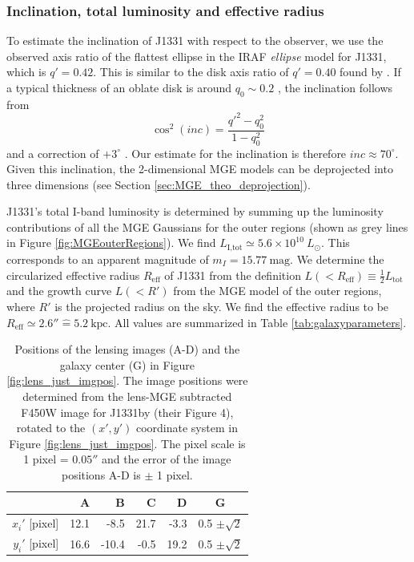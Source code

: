 \documentclass[useAMS,usenatbib]{mnras}
\begin{document}
\subsubsection{Inclination, total luminosity and effective radius}

To estimate the inclination of J1331 with respect to the observer, we use the observed axis ratio of the flattest ellipse in the IRAF \emph{ellipse} model for J1331, which is $q'=0.42$. This is similar to the disk axis ratio of $q' = 0.40$ found by \citet{SWELLSI}. If a typical thickness of an oblate disk is around $q_0 \sim 0.2$ \citep{1958MeLu2.136....1H}, the inclination follows from 
\begin{equation}
\cos^2 (inc) = \frac{q'^2 - q_0^2}{1 - q_0^2}
\end{equation}
and a correction of $+3^\circ$ \citep{1988ngc..book.....T}. Our estimate for the inclination is therefore $inc \approx 70^\circ$. Given this inclination, the 2-dimensional MGE models can be deprojected into three dimensions (see Section \ref{sec:MGE_theo_deprojection}).

J1331's total I-band luminosity is determined by summing up the luminosity contributions of all the MGE Gaussians for the outer regions (shown as grey lines in Figure \ref{fig:MGEouterRegions}). We find $L_\text{I,tot} \simeq 5.6 \times 10^{10} ~L_\odot$. This corresponds to an apparent magnitude of $m_I = 15.77~\text{mag}$. We determine the circularized effective radius $R_\text{eff}$ of J1331 from the definition $L(<R_\text{eff}) \equiv \frac 12 L_\text{tot}$ and the growth curve $L(<R')$ from the MGE model of the outer regions, where $R'$ is the projected radius on the sky. We find the effective radius to be $R_\text{eff} \simeq 2.6'' \hat{=} 5.2~\text{kpc}$.  All values are summarized in Table \ref{tab:galaxyparameters}.

\begin{table}
\centering
\caption{Positions of the lensing images (A-D) and the galaxy center (G) in Figure \ref{fig:lens_just_imgpos}. The image positions were determined from the lens-MGE subtracted F450W image for J1331by \citet{SWELLSIII} (their Figure 4), rotated to the $(x',y')$ coordinate system in Figure \ref{fig:lens_just_imgpos}. The pixel scale is 1 pixel = $0.05''$ and the error of the image positions A-D is $\pm$ 1 pixel.}
\begin{tabular}{r|rrrr|c}
\hline
  & A & B & C & D & G\\\hline
$x_i'$ [pixel] & 12.1 & -8.5 & 21.7 & -3.3 & 0.5 $\pm \sqrt{2}$ \\
$y_i'$ [pixel] & 16.6 & -10.4 & -0.5 & 19.2 & 0.5 $\pm \sqrt{2}$ \\
\hline
\end{tabular}
\label{tab:lenspos}
\end{table}
\end{document}

